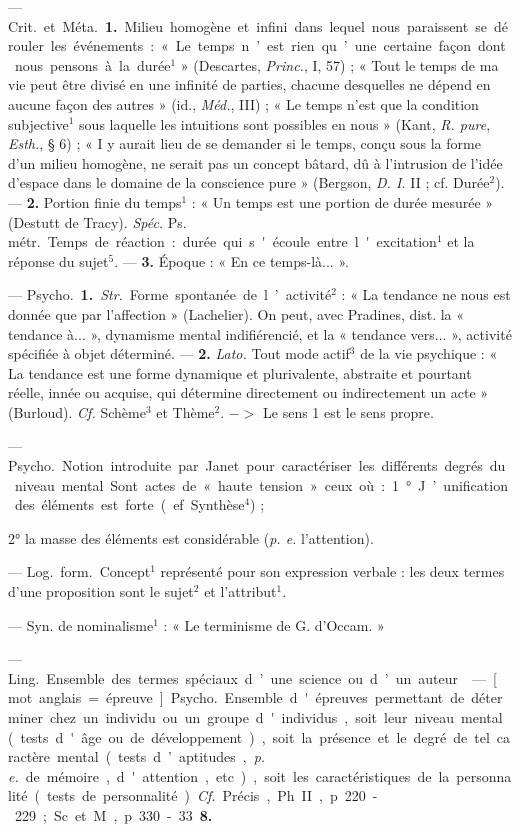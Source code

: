 \begin{itemize}[leftmargin=1cm, label=, itemsep=1pt]
 — \si{Crit.} et \si{Méta.} {\bf 1.} Milieu
homogène et infini dans lequel nous
paraissent se dérouler les événements :
« Le temps n’est rien qu’une
certaine façon dont nous pensons à
la durée$^1$ » (Descartes, {\it Princ.}, I, 57) ;
« Tout le temps de ma vie peut être
divisé en une infinité de parties,
chacune desquelles ne dépend en
aucune façon des autres » (id., \si{{\it Méd.}},
III) ; « Le temps n’est que la condition subjective$^1$ sous laquelle les
intuitions sont possibles en nous »
(Kant, {\it R. pure}, {\it Esth.}, § 6) ; « I y
aurait lieu de se demander si le
temps, conçu sous la forme d’un
milieu homogène, ne serait pas un
concept bâtard, dû à l’intrusion de
l’idée d'espace dans le domaine de
la conscience pure » (Bergson, {\it D. I.}
II ; cf. Durée$^2$). — {\bf 2.} Portion finie
du temps$^1$ : « Un temps est une portion de durée mesurée » (Destutt
de Tracy). {\it Spéc.} \si{Ps. métr.} Temps de
réaction : durée qui s'écoule entre
l'excitation$^1$ et la réponse du sujet$^5$.
— {\bf 3.} Époque : « En ce temps-là... ».

 — \si{Psycho.} {\bf 1.} {\it Str.} Forme
spontanée de l’activité$^2$ : « La tendance ne nous est donnée que par
l’affection » (Lachelier). On peut,
avec Pradines, dist. la « tendance
à... », dynamisme mental indifiérencié, et la « tendance vers... »,
activité spécifiée à objet déterminé.
— {\bf 2.} {\it Lato.} Tout mode actif$^3$ de la
vie psychique : « La tendance est
une forme dynamique et plurivalente, abstraite et pourtant réelle,
innée ou acquise, qui détermine
directement ou indirectement un
acte » (Burloud). {\it Cf.} Schème$^3$ et
Thème$^2$. $->$ Le sens 1 est le sens
propre.

 — \si{Psycho.}
Notion introduite par Janet pour
caractériser les différents degrés du
niveau mental. Sont actes de « haute
tension » ceux où : 1° J’unification
des éléments est forte (ef. Synthèse$^4$) ;

2° la masse des éléments est considérable ({\it p. e.} l'attention).

 — \si{Log.} \si{form.} Concept$^1$ représenté pour son expression verbale :
les deux termes d’une proposition
sont le sujet$^2$ et l’attribut$^1$.

 — Syn. de nominalisme$^1$ :
« Le terminisme de G. d’Occam. »

 — \si{Ling.} Ensemble des
termes spéciaux d’une science ou
d’un auteur.

 — [mot anglais = épreuve] \si{Psycho.}
Ensemble d'épreuves permettant
de déterminer chez un individu
ou un groupe d'individus, soit
leur niveau mental (tests d'âge
ou de développement), soit la présence et le degré de tel caractère
mental (tests d’aptitudes, {\it p. e.} de
mémoire, d'attention, etc.), soit les
caractéristiques de la personnalité
(tests de personnalité). {\it Cf.} Précis,
Ph. II, p. 220-229; Sc. et M., p. 330-33 {\bf 8.}


\end{itemize}

